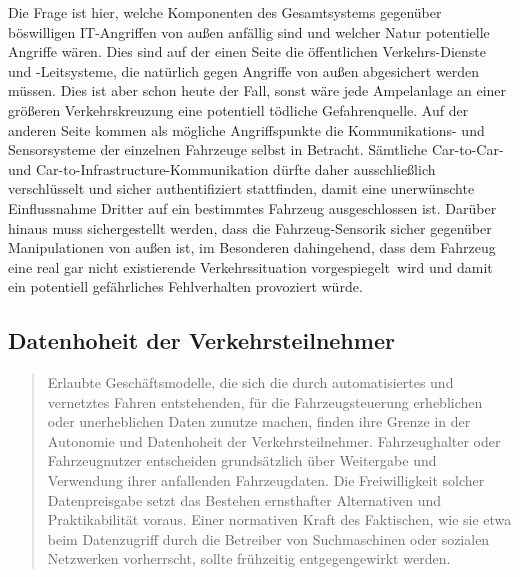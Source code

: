 \documentclass[twoside,a4paper,12pt]{article}
\begin{document}
Die Frage ist hier, welche Komponenten des Gesamtsystems  gegenüber böswilligen IT-Angriffen von außen anfällig sind und welcher Natur potentielle Angriffe
wären. Dies sind auf der einen Seite die öffentlichen Verkehrs-Dienste und -Leitsysteme, die natürlich gegen Angriffe von außen abgesichert werden müssen. 
Dies ist aber schon heute der Fall, sonst wäre jede Ampelanlage an einer größeren Verkehrskreuzung eine potentiell tödliche Gefahrenquelle. Auf der anderen Seite kommen als mögliche Angriffspunkte die Kommunikations- und Sensorsysteme der einzelnen Fahrzeuge selbst in Betracht. Sämtliche Car-to-Car- und Car-to-Infrastructure-Kommunikation dürfte daher ausschließlich verschlüsselt und sicher authentifiziert stattfinden, damit eine unerwünschte Einflussnahme Dritter auf ein bestimmtes Fahrzeug ausgeschlossen ist. Darüber hinaus muss sichergestellt werden, dass die Fahrzeug-Sensorik sicher gegenüber Manipulationen von außen ist, 
im Besonderen dahingehend, dass dem Fahrzeug eine real gar nicht existierende Verkehrssituation \glqq vorgespiegelt\grqq\ wird und damit ein potentiell 
gefährliches Fehlverhalten provoziert würde.\\

\subsection{Datenhoheit der Verkehrsteilnehmer} \label{DatenhoheitDerVerkehrsteilnehmer}

\begin{quote}
\glqq
Erlaubte Geschäftsmodelle, die sich die durch automatisiertes und vernetztes Fahren entstehenden, für die Fahrzeugsteuerung 
erheblichen oder unerheblichen Daten zunutze
machen, finden ihre Grenze in der Autonomie und Datenhoheit der Verkehrsteilnehmer.
Fahrzeughalter oder Fahrzeugnutzer entscheiden grundsätzlich über Weitergabe und
Verwendung ihrer anfallenden Fahrzeugdaten. Die Freiwilligkeit solcher Datenpreisgabe
setzt das Bestehen ernsthafter Alternativen und Praktikabilität voraus. Einer normativen
Kraft des Faktischen, wie sie etwa beim Datenzugriff durch die Betreiber von Suchmaschinen oder sozialen Netzwerken vorherrscht, 
sollte frühzeitig entgegengewirkt werden.\grqq\mbox{~\cite[S. 12]{ek}}
\end{quote}
\end{document}
